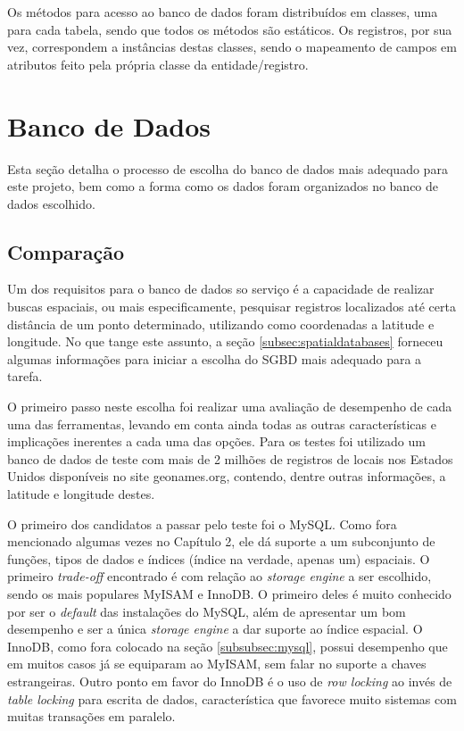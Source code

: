 \documentclass[diss]{template/setrem}
\begin{document}
Os métodos para acesso ao banco de dados foram distribuídos em classes, uma para cada tabela, sendo que todos os métodos são estáticos. Os registros, por sua vez, correspondem a instâncias destas classes, sendo o mapeamento de campos em atributos feito pela própria classe da entidade/registro.

\section{Banco de Dados}
Esta seção detalha o processo de escolha do banco de dados mais adequado para este projeto, bem como a forma como os dados foram organizados no banco de dados escolhido.

\subsection{Comparação}
Um dos requisitos para o banco de dados so serviço é a capacidade de realizar buscas espaciais, ou mais especificamente, pesquisar registros localizados até certa distância de um ponto determinado, utilizando como coordenadas a latitude e longitude. No que tange este assunto, a seção \ref{subsec:spatialdatabases} forneceu algumas informações para iniciar a escolha do SGBD mais adequado para a tarefa.

O primeiro passo neste escolha foi realizar uma avaliação de desempenho de cada uma das ferramentas, levando em conta ainda todas as outras características e implicações inerentes a cada uma das opções. Para os testes foi utilizado um banco de dados de teste com mais de 2 milhões de registros de locais nos Estados Unidos disponíveis no site geonames.org, contendo, dentre outras informações, a latitude e longitude destes.

O primeiro dos candidatos a passar pelo teste foi o MySQL. Como fora mencionado algumas vezes no Capítulo 2, ele dá suporte a um subconjunto de funções, tipos de dados e índices (índice na verdade, apenas um) espaciais. O primeiro \emph{trade-off} encontrado é com relação ao \emph{storage engine} a ser escolhido, sendo os mais populares MyISAM e InnoDB. O primeiro deles é muito conhecido por ser o \emph{default} das instalações do MySQL, além de apresentar um bom desempenho e ser a única \emph{storage engine} a dar suporte ao índice espacial. O InnoDB, como fora colocado na seção \ref{subsubsec:mysql}, possui desempenho que em muitos casos já se equiparam ao MyISAM, sem falar no suporte a chaves estrangeiras. Outro ponto em favor do InnoDB é o uso de \emph{row locking} ao invés de \emph{table locking} para escrita de dados, característica que favorece muito sistemas com muitas transações em paralelo.
\end{document}
